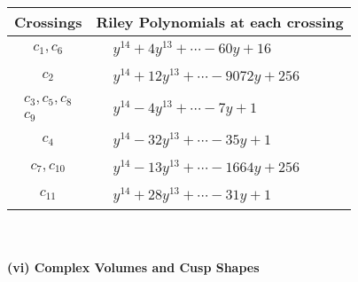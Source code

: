\documentclass[1p]{elsarticle_modified}
\theoremstyle{definition}
\begin{document}
\begin{tabular}{m{50pt}|m{274pt}}
Crossings & \hspace{64pt}Riley Polynomials at each crossing \\
\hline $$\begin{aligned}c_{1},c_{6}\end{aligned}$$&$\begin{aligned}
&y^{14}+4 y^{13}+\cdots-60 y+16
\end{aligned}$\\
\hline $$\begin{aligned}c_{2}\end{aligned}$$&$\begin{aligned}
&y^{14}+12 y^{13}+\cdots-9072 y+256
\end{aligned}$\\
\hline $$\begin{aligned}c_{3},c_{5},c_{8}\\c_{9}\end{aligned}$$&$\begin{aligned}
&y^{14}-4 y^{13}+\cdots-7 y+1
\end{aligned}$\\
\hline $$\begin{aligned}c_{4}\end{aligned}$$&$\begin{aligned}
&y^{14}-32 y^{13}+\cdots-35 y+1
\end{aligned}$\\
\hline $$\begin{aligned}c_{7},c_{10}\end{aligned}$$&$\begin{aligned}
&y^{14}-13 y^{13}+\cdots-1664 y+256
\end{aligned}$\\
\hline $$\begin{aligned}c_{11}\end{aligned}$$&$\begin{aligned}
&y^{14}+28 y^{13}+\cdots-31 y+1
\end{aligned}$\\
\hline
\end{tabular}\\~\\
\newpage\flushleft \textbf{(vi) Complex Volumes and Cusp Shapes}
\end{document}
